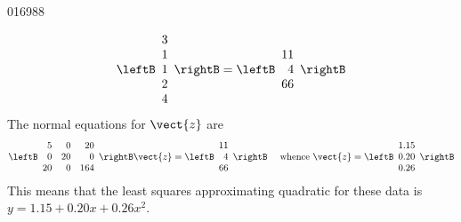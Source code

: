 \begin{example}{}{016988}
\begin{solution}
\begin{equation*}
\leftB \begin{array}{r}
3 \\
1 \\
1 \\
2 \\
4 
\end{array} \rightB
= \leftB \begin{array}{r}
11 \\
4 \\
66
\end{array} \rightB
\end{equation*}
The normal equations for $\vect{z}$ are
\begin{equation*}
\leftB \begin{array}{rrr}
 5 &  0 & 20 \\
 0 & 20 &  0 \\
20 &  0 & 164 
\end{array} \rightB
\vect{z} = 
\leftB \begin{array}{r}
11 \\
4 \\
66
\end{array} \rightB \quad
\mbox{ whence } \vect{z} = 
\leftB \begin{array}{r}
1.15 \\
0.20 \\
0.26
\end{array} \rightB
\end{equation*}
This means that the least squares approximating quadratic for these data is $y = 1.15 + 0.20x + 0.26x^{2}$.
\end{solution}
\end{example}

